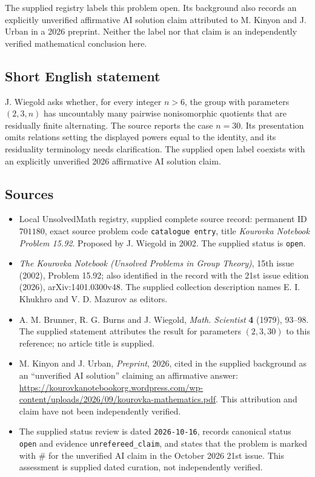 \documentclass[11pt]{article}
\begin{document}
The supplied registry labels this problem open. Its background also records an explicitly unverified affirmative AI solution claim attributed to M. Kinyon and J. Urban in a 2026 preprint. Neither the label nor that claim is an independently verified mathematical conclusion here.
\subsection{Short English statement}
J. Wiegold asks whether, for every integer \(n>6\), the group with parameters \((2,3,n)\) has uncountably many pairwise nonisomorphic quotients that are residually finite alternating. The source reports the case \(n=30\). Its presentation omits relations setting the displayed powers equal to the identity, and its residuality terminology needs clarification. The supplied open label coexists with an explicitly unverified 2026 affirmative AI solution claim.
\subsection{Sources}
\begin{itemize}
\item Local UnsolvedMath registry, supplied complete source record: permanent ID \(701180\), exact source problem code \texttt{catalogue entry}, title \emph{Kourovka Notebook Problem 15.92}. Proposed by J. Wiegold in 2002. The supplied status is \texttt{open}.
\item \emph{The Kourovka Notebook (Unsolved Problems in Group Theory)}, 15th issue (2002), Problem 15.92; also identified in the record with the 21st issue edition (2026), arXiv:1401.0300v48. The supplied collection description names E. I. Khukhro and V. D. Mazurov as editors.
\item A. M. Brunner, R. G. Burns and J. Wiegold, \emph{Math. Scientist} \textbf{4} (1979), 93--98. The supplied statement attributes the result for parameters \((2,3,30)\) to this reference; no article title is supplied.
\item M. Kinyon and J. Urban, \emph{Preprint}, 2026, cited in the supplied background as an ``unverified AI solution'' claiming an affirmative answer: \url{https://kourovkanotebookorg.wordpress.com/wp-content/uploads/2026/09/kourovka-mathematics.pdf}. This attribution and claim have not been independently verified.
\item The supplied status review is dated \texttt{2026-10-16}, records canonical status \texttt{open} and evidence \texttt{unrefereed\_claim}, and states that the problem is marked with \(\#\) for the unverified AI claim in the October 2026 21st issue. This assessment is supplied dated curation, not independently verified.
\end{itemize}
\end{document}
